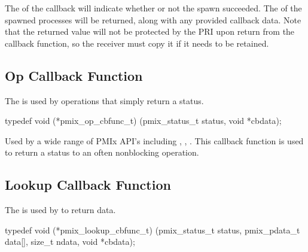 The  of the callback will indicate whether or not the spawn succeeded.
The  of the spawned processes will be returned, along with any provided callback data.
Note that the returned  value will not be protected by the \ac{PRI} upon return from the callback function, so the receiver must copy it if it needs to be retained.


\subsection{Op Callback Function}

\summary

The  is used by operations that simply return a status.

\cspecificstart
\begin{codepar}
typedef void (*pmix_op_cbfunc_t)
    (pmix_status_t status, void *cbdata);
\end{codepar}
\cspecificend

\begin{arglist}
\end{arglist}

\descr

Used by a wide range of \ac{PMIx} API's including , , .
This callback function is used to return a status to an often nonblocking operation.


\subsection{Lookup Callback Function}

\summary

The  is used by  to return data.

\cspecificstart
\begin{codepar}
typedef void (*pmix_lookup_cbfunc_t)
    (pmix_status_t status,
     pmix_pdata_t data[], size_t ndata,
     void *cbdata);
\end{codepar}
\cspecificend

\begin{arglist}
\end{arglist}


